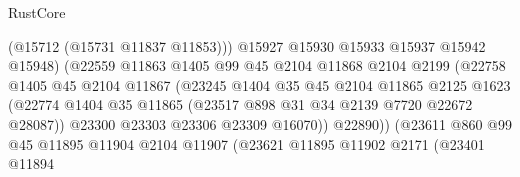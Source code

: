 \begin{lexlean}{RustCore}
\begin{coremodule}
                                          (@15712 (@15731 @11837 @11853)))
                                        @15927
                                        @15930
                                        @15933
                                        @15937
                                        @15942
                                        @15948)
                                      (@22559
                                        @11863
                                        @1405
                                        @99
                                        @45
                                        @2104
                                        @11868
                                        @2104
                                        @2199
                                        (@22758
                                          @1405
                                          @45
                                          @2104
                                          @11867
                                          (@23245
                                            @1404
                                            @35
                                            @45
                                            @2104
                                            @11865
                                            @2125
                                            @1623
                                            (@22774
                                              @1404
                                              @35
                                              @11865
                                              (@23517 @898 @31 @34 @2139 @7720 @22672 @28087))
                                            @23300
                                            @23303
                                            @23306
                                            @23309
                                            @16070))
                                        @22890))
                                    (@23611
                                      @860
                                      @99
                                      @45
                                      @11895
                                      @11904
                                      @2104
                                      @11907
                                      (@23621
                                        @11895
                                        @11902
                                        @2171
                                        (@23401
                                          @11894

\end{coremodule}
\end{lexlean}
